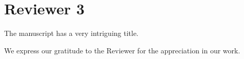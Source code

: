 %
%
\section*{Reviewer 3}
%
\begin{ReviewerComment}{3}
The manuscript has a very intriguing title.\end{ReviewerComment}
%
\begin{Answer}
We express our gratitude to the Reviewer for the appreciation in our work.
 \RevTaskDone
\end{Answer}